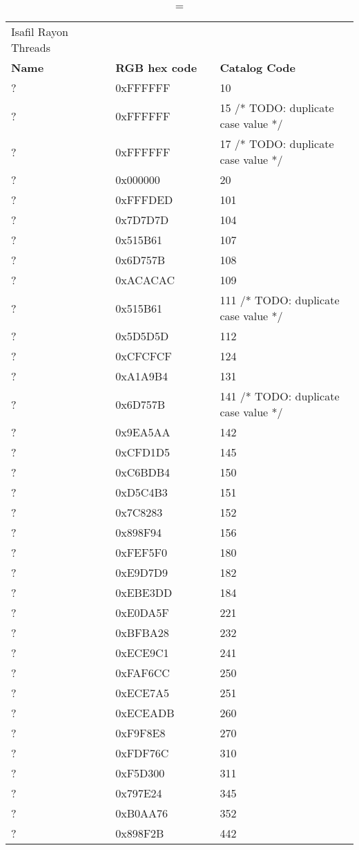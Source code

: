 
\begin{longtable}{p{0.3\linewidth} p{0.3\linewidth} p{0.4\linewidth}}
\caption = {Isafil Rayon Threads}
\label{tblr:isafil}\\
\textbf{Name} & \textbf{RGB hex code} & \textbf{Catalog Code} \\
? &  0xFFFFFF &  10\\
? &  0xFFFFFF &  15 /* TODO: duplicate case value */\\
? &  0xFFFFFF &  17 /* TODO: duplicate case value */\\
? &  0x000000 &  20\\
? &  0xFFFDED &  101\\
? &  0x7D7D7D &  104\\
? &  0x515B61 &  107\\
? &  0x6D757B &  108\\
? &  0xACACAC &  109\\
? &  0x515B61 &  111 /* TODO: duplicate case value */\\
? &  0x5D5D5D &  112\\
? &  0xCFCFCF &  124\\
? &  0xA1A9B4 &  131\\
? &  0x6D757B &  141 /* TODO: duplicate case value */\\
? &  0x9EA5AA &  142\\
? &  0xCFD1D5 &  145\\
? &  0xC6BDB4 &  150\\
? &  0xD5C4B3 &  151\\
? &  0x7C8283 &  152\\
? &  0x898F94 &  156\\
? &  0xFEF5F0 &  180\\
? &  0xE9D7D9 &  182\\
? &  0xEBE3DD &  184\\
? &  0xE0DA5F &  221\\
? &  0xBFBA28 &  232\\
? &  0xECE9C1 &  241\\
? &  0xFAF6CC &  250\\
? &  0xECE7A5 &  251\\
? &  0xECEADB &  260\\
? &  0xF9F8E8 &  270\\
? &  0xFDF76C &  310\\
? &  0xF5D300 &  311\\
? &  0x797E24 &  345\\
? &  0xB0AA76 &  352\\
? &  0x898F2B &  442\\

\end{longtable}
